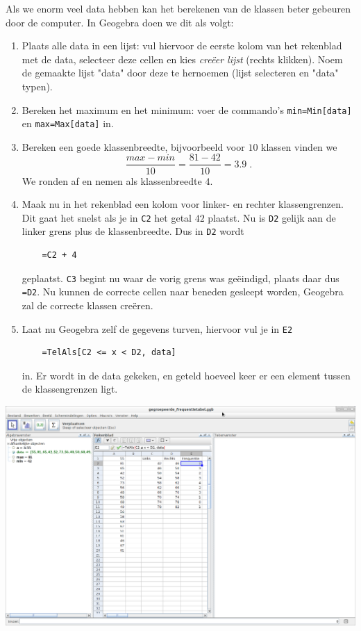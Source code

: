 \documentclass[12pt,twoside]{article}
\begin{document}
Als we enorm veel data hebben kan het berekenen van de klassen beter gebeuren door de computer. In Geogebra doen we dit als volgt:
\begin{enumerate}
  \item Plaats alle data in een lijst: vul hiervoor de eerste kolom van het rekenblad met de data, selecteer deze cellen en kies {\it creëer lijst} (rechts klikken). Noem de gemaakte lijst "data" door deze te hernoemen (lijst selecteren en "data" typen).
  \item Bereken het maximum en het minimum: voer de commando's \verb#min=Min[data]# en \verb#max=Max[data]# in.
  \item Bereken een goede klassenbreedte, bijvoorbeeld voor $10$ klassen vinden we $$\frac{max-min}{10}=\frac{81-42}{10}=3.9\;.$$ We ronden af en nemen als klassenbreedte $4$.
  \item Maak nu in het rekenblad een kolom voor linker- en rechter klassengrenzen. Dit gaat het snelst als je in \verb#C2# het getal $42$ plaatst. Nu is \verb#D2# gelijk aan de linker grens plus de klassenbreedte. Dus in \verb#D2# wordt 
  \begin{verbatim}
    =C2 + 4
  \end{verbatim} 
  geplaatst. \verb#C3# begint nu waar de vorig grens was geëindigd, plaats daar dus \verb#=D2#. Nu kunnen de correcte cellen naar beneden gesleept worden, Geogebra zal de correcte klassen creëren.
  \item Laat nu Geogebra zelf de gegevens turven, hiervoor vul je in \verb#E2# 
  \begin{verbatim}
    =TelAls[C2 <= x < D2, data]
  \end{verbatim}
  in. Er wordt in de data gekeken, en geteld hoeveel keer er een element tussen de klassengrenzen ligt.
\end{enumerate}

\begin{center}
  \includegraphics[width=14cm]{gg-gegroepeerde_frequentietabel}
\end{center}
\end{document}
